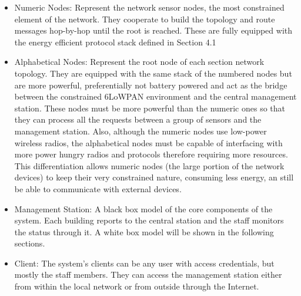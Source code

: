 \begin{itemize}
	\item Numeric Nodes: Represent the network sensor nodes, the most constrained element of the network. They cooperate to build the topology and route messages hop-by-hop until the root is reached. These are fully equipped with the energy efficient protocol stack defined in Section 4.1\\
	\item Alphabetical Nodes: Represent the root node of each section network topology. They are equipped with the same stack of the numbered nodes but are more powerful, preferentially not battery powered and act as the bridge between the constrained 6LoWPAN environment and the central management station. These nodes must be more powerful than the numeric ones so that they can process all the requests between a group of sensors and the management station. Also, although the numeric nodes use low-power wireless radios, the alphabetical nodes must be capable of interfacing with more power hungry radios and protocols therefore requiring more resources. This differentiation allows numeric nodes (the large portion of the network devices) to keep their very constrained nature, consuming less energy, an still be able to communicate with external devices.\\
	\item Management Station: A black box model of the core components of the system. Each building reports to the central station and the staff monitors the status through it. A white box model will be shown in the following sections.\\
	\item Client: The system's clients can be any user with access credentials, but mostly the staff members. They can access the management station either from within the local network or from outside through the Internet.
\end{itemize}

\vspace{25mm} %
 
